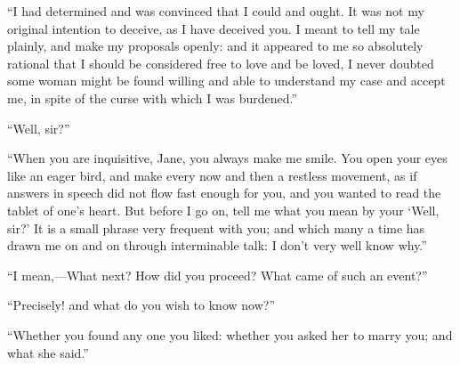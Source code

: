 \enquote{I had determined and was convinced that I could and ought. It
was not my original intention to deceive, as I have deceived you. I
meant to tell my tale plainly, and make my proposals openly: and it
appeared to me so absolutely rational that I should be considered free
to love and be loved, I never doubted some woman might be found willing
and able to understand my case and accept me, in spite of the curse with
which I was burdened.}

\enquote{Well, sir?}

\enquote{When you are inquisitive, Jane, you always make me smile. You
open your eyes like an eager bird, and make every now and then a
restless movement, as if answers in speech did not flow fast enough for
you, and you wanted to read the tablet of one's heart. But before I go
on, tell me what you mean by your \enquote{Well, sir?} It is a small
phrase very frequent with you; and which many a time has drawn me on and
on through interminable talk: I don't very well know why.}

\enquote{I mean,---What next? How did you proceed? What came of such
an event?}

\enquote{Precisely! and what do you wish to know now?}

\enquote{Whether you found any one you liked: whether you asked her to
marry you; and what she said.}

